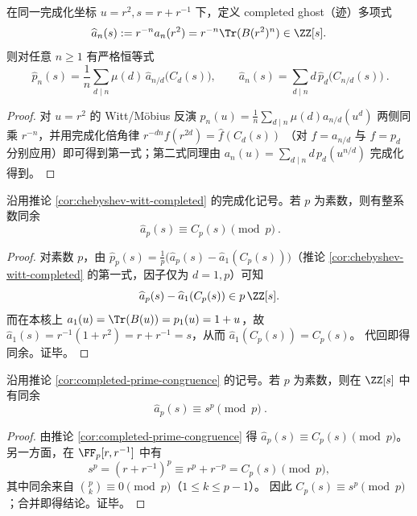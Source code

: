 \begin{corollary}\label{cor:chebyshev-witt-completed}
在同一完成化坐标 \(u=r^2,s=r+r^{-1}\) 下，定义 completed ghost（迹）多项式
\[
\widehat a_n(s):=r^{-n}a_n(r^2)=r^{-n}\Tr(B(r^2)^n)\in\ZZ[s].
\]
则对任意 \(n\ge 1\) 有严格恒等式
\[
\boxed{\ 
\widehat p_n(s)=\frac1n\sum_{d\mid n}\mu(d)\,\widehat a_{n/d}\!\bigl(C_d(s)\bigr),
\qquad
\widehat a_n(s)=\sum_{d\mid n}d\,\widehat p_d\!\bigl(C_{n/d}(s)\bigr)
\ }.
\]
\end{corollary}
\begin{proof}
对 \(u=r^2\) 的 Witt/Möbius 反演
\(
p_n(u)=\frac1n\sum_{d\mid n}\mu(d)a_{n/d}(u^d)
\)
两侧同乘 \(r^{-n}\)，并用完成化倍角律
\(
r^{-dn}f(r^{2d})=\widehat f(C_d(s))
\)
（对 \(f=a_{n/d}\) 与 \(f=p_d\) 分别应用）即可得到第一式；第二式同理由
\(
a_n(u)=\sum_{d\mid n} d\,p_d(u^{n/d})
\)
完成化得到。
\end{proof}

\begin{corollary}\label{cor:completed-prime-congruence}
沿用推论 \ref{cor:chebyshev-witt-completed} 的完成化记号。若 \(p\) 为素数，则有整系数同余
\[
\boxed{\ \widehat a_p(s)\equiv C_p(s)\pmod p\ }.
\]
\end{corollary}
\begin{proof}
对素数 \(p\)，由 \(\widehat p_p(s)=\frac1p\bigl(\widehat a_p(s)-\widehat a_1(C_p(s))\bigr)\)（推论 \ref{cor:chebyshev-witt-completed} 的第一式，因子仅为 \(d=1,p\)）可知
\[
\widehat a_p(s)-\widehat a_1(C_p(s))\in p\,\ZZ[s].
\]
而在本核上 \(a_1(u)=\Tr(B(u))=p_1(u)=1+u\)，故
\(
\widehat a_1(s)=r^{-1}(1+r^2)=r+r^{-1}=s
\)，从而 \(\widehat a_1(C_p(s))=C_p(s)\)。
代回即得同余。证毕。
\end{proof}

\begin{corollary}\label{cor:completed-teichmueller-congruence}
沿用推论 \ref{cor:completed-prime-congruence} 的记号。若 \(p\) 为素数，则在 \(\ZZ[s]\) 中有同余
\[
\boxed{\ \widehat a_p(s)\equiv s^p\pmod p\ }.
\]
\end{corollary}
\begin{proof}
由推论 \ref{cor:completed-prime-congruence} 得 \(\widehat a_p(s)\equiv C_p(s)\pmod p\)。
另一方面，在 \(\FF_p[r,r^{-1}]\) 中有
\[
s^p=(r+r^{-1})^p\equiv r^p+r^{-p}=C_p(s)\pmod p,
\]
其中同余来自 \(\binom{p}{k}\equiv 0\pmod p\)（\(1\le k\le p-1\)）。
因此 \(C_p(s)\equiv s^p\pmod p\)；合并即得结论。证毕。
\end{proof}

